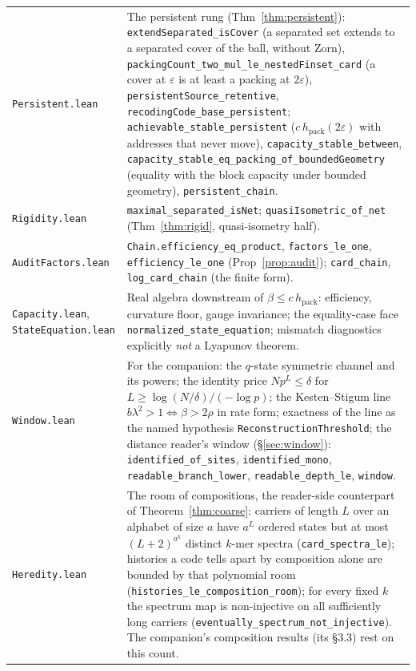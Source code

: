 \documentclass[11pt,reqno]{amsart}
\theoremstyle{plain}
\theoremstyle{definition}
\newcommand{\hpack}{h_{\mathrm{pack}}}
\newcommand{\eps}{\varepsilon}
\begin{document}
{\begin{longtable}{@{}>{\raggedright\arraybackslash}p{3.3cm}>{\raggedright\arraybackslash}p{10.4cm}@{}}
\texttt{Persistent.lean} & The persistent rung (Thm~\ref{thm:persistent}): \texttt{extendSeparated\_isCover} (a separated set extends to a separated cover of the ball, without Zorn), \texttt{packingCount\_two\_mul\_le\_nestedFinset\_card} (a cover at $\eps$ is at least a packing at $2\eps$), \texttt{persistentSource\_retentive}, \texttt{recodingCode\_base\_persistent}; \texttt{achievable\_stable\_persistent} ($c\,\hpack(2\eps)$ with addresses that never move), \texttt{capacity\_stable\_between}, \texttt{capacity\_stable\_eq\_packing\_of\_boundedGeometry} (equality with the block capacity under bounded geometry), \texttt{persistent\_chain}. \\
\texttt{Rigidity.lean} & \texttt{maximal\_separated\_isNet}; \texttt{quasiIsometric\_of\_net} (Thm~\ref{thm:rigid}, quasi-isometry half). \\
\texttt{AuditFactors.lean} & \texttt{Chain.efficiency\_eq\_product}, \texttt{factors\_le\_one}, \texttt{efficiency\_le\_one} (Prop~\ref{prop:audit}); \texttt{card\_chain}, \texttt{log\_card\_chain} (the finite form). \\
\texttt{Capacity.lean}, \texttt{StateEquation.lean} & Real algebra downstream of $\beta\le c\,\hpack$: efficiency, curvature floor, gauge invariance; the equality-case face \texttt{normalized\_state\_equation}; mismatch diagnostics explicitly \emph{not} a Lyapunov theorem. \\
\texttt{Window.lean} & For the companion: the $q$-state symmetric channel and its powers; the identity price $Np^L\le\delta$ for $L\ge\log(N/\delta)/(-\log p)$; the Kesten--Stigum line $b\lambda^2>1\iff\beta>2\rho$ in rate form; exactness of the line as the named hypothesis \texttt{ReconstructionThreshold}; the distance reader's window (\S\ref{sec:window}): \texttt{identified\_of\_sites}, \texttt{identified\_mono}, \texttt{readable\_branch\_lower}, \texttt{readable\_depth\_le}, \texttt{window}. \\
\texttt{Heredity.lean} & The room of compositions, the reader-side counterpart of Theorem~\ref{thm:coarse}: carriers of length $L$ over an alphabet of size $a$ have $a^L$ ordered states but at most $(L+2)^{a^k}$ distinct $k$-mer spectra (\texttt{card\_spectra\_le}); histories a code tells apart by composition alone are bounded by that polynomial room (\texttt{histories\_le\_composition\_room}); for every fixed $k$ the spectrum map is non-injective on all sufficiently long carriers (\texttt{eventually\_spectrum\_not\_injective}). The companion's composition results (its \S3.3) rest on this count. \\
\bottomrule
\end{longtable}}
\end{document}

